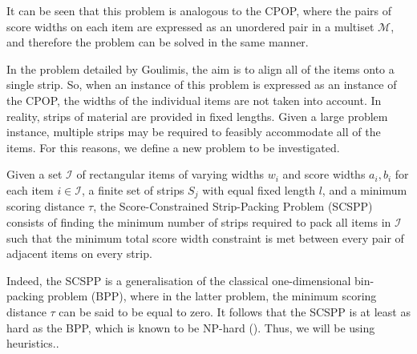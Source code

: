 \documentclass[oribibl]{llncs}
\begin{document}
It can be seen that this problem is analogous to the CPOP, where the pairs of score widths on each item are expressed as an unordered pair in a multiset $\mathcal{M}$, and therefore the problem can be solved in the same manner.

In the problem detailed by Goulimis, the aim is to align all of the items onto a single strip. So, when an instance of this problem is expressed as an instance of the CPOP, the widths of the individual items are not taken into account. In reality, strips of material are provided in fixed lengths. Given a large problem instance, multiple strips may be required to feasibly accommodate all of the items. For this reasons, we define a new problem to be investigated.

\begin{definition}
	Given a set $\mathcal{I}$ of rectangular items of varying widths $w_i$ and score widths $a_i, b_i$ for each item $i \in \mathcal{I}$, a finite set of strips $S_j$ with equal fixed length $l$, and a minimum scoring distance $\tau$, the Score-Constrained Strip-Packing Problem (SCSPP) consists of finding the minimum number of strips required to pack all items in $\mathcal{I}$ such that the minimum total score width constraint is met between every pair of adjacent items on every strip.
\end{definition}

Indeed, the SCSPP is a generalisation of the classical one-dimensional bin-packing problem (BPP), where in the latter problem, the minimum scoring distance $\tau$ can be said to be equal to zero. It follows that the SCSPP is at least as hard as the BPP, which is known to be NP-hard (\citealp{garey1979}). Thus, we will be using heuristics..
\end{document}
